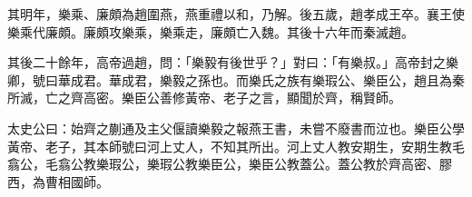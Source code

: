 \begin{pinyinscope}
其明年，樂乘、廉頗為趙圍燕，燕重禮以和，乃解。後五歲，趙孝成王卒。襄王使樂乘代廉頗。廉頗攻樂乘，樂乘走，廉頗亡入魏。其後十六年而秦滅趙。

其後二十餘年，高帝過趙，問：「樂毅有後世乎？」對曰：「有樂叔。」高帝封之樂卿，號曰華成君。華成君，樂毅之孫也。而樂氏之族有樂瑕公、樂臣公，趙且為秦所滅，亡之齊高密。樂臣公善修黃帝、老子之言，顯聞於齊，稱賢師。

太史公曰：始齊之蒯通及主父偃讀樂毅之報燕王書，未嘗不廢書而泣也。樂臣公學黃帝、老子，其本師號曰河上丈人，不知其所出。河上丈人教安期生，安期生教毛翕公，毛翕公教樂瑕公，樂瑕公教樂臣公，樂臣公教蓋公。蓋公教於齊高密、膠西，為曹相國師。


\end{pinyinscope}